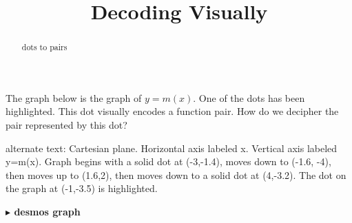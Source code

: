 \documentclass{ximera}
\title{Decoding Visually}
\begin{document}
\begin{abstract}
dots to pairs
\end{abstract}
\maketitle










The graph below is the graph of $y = m(x)$.  One of the dots has been highlighted. This dot visually encodes a function pair.  How do we decipher the pair represented by this dot?


\begin{image}
\end{image}






\textcolor{gray!90}{alternate text: Cartesian plane. Horizontal axis labeled x. Vertical axis labeled y=m(x).  Graph begins with a solid dot at (-3,-1.4), moves down to (-1.6, -4), then moves up to (1.6,2), then moves down to a solid dot at (4,-3.2). The dot on the graph at (-1,-3.5) is highlighted.}




\begin{onlineOnly}
\textbf{\textcolor{blue!55!black}{$\blacktriangleright$ desmos graph}} 
\begin{center}
\end{center}
\end{onlineOnly}
\end{document}

